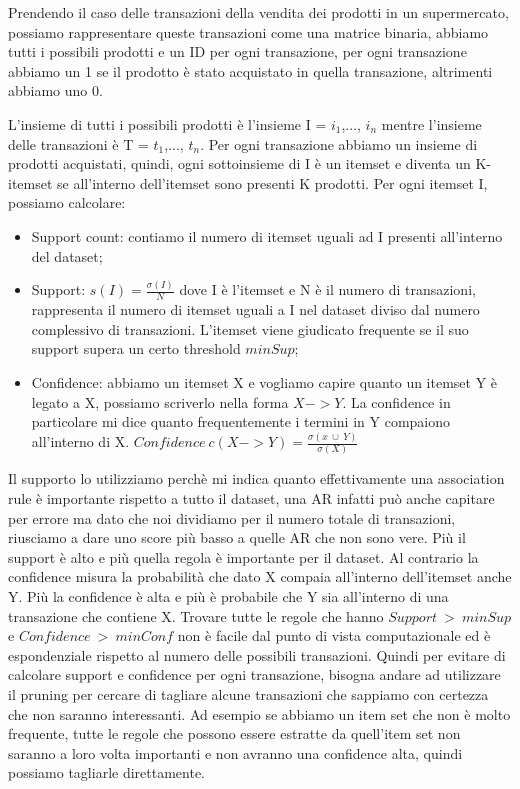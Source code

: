 \documentclass[14pt]{extreport}
\begin{document}
Prendendo il caso delle transazioni della vendita dei prodotti in un supermercato, possiamo rappresentare queste transazioni come una matrice binaria, abbiamo tutti i possibili prodotti e un ID per ogni transazione, per ogni transazione abbiamo un 1 se il prodotto è stato acquistato in quella transazione, altrimenti abbiamo uno 0.

L'insieme di tutti i possibili prodotti è l'insieme I = {$i_1$,..., $i_n$} mentre l'insieme delle transazioni è T = {$t_1$,..., $t_n$}.
Per ogni transazione abbiamo un insieme di prodotti acquistati, quindi, ogni sottoinsieme di I è un itemset e diventa un K-itemset se all'interno dell'itemset sono presenti K prodotti.
Per ogni itemset I, possiamo calcolare:
\begin{itemize}
    \item Support count: contiamo il numero di itemset uguali ad I presenti all'interno del dataset;
    \item Support: $s(I) = \frac{\sigma{(I)}}{N}$ dove I è l'itemset e N è il numero di transazioni, rappresenta il numero di itemset uguali a I nel dataset diviso dal numero complessivo di transazioni. L'itemset viene giudicato frequente se il suo support supera un certo threshold $minSup$;
    \item Confidence: abbiamo un itemset X e vogliamo capire quanto un itemset Y è legato a X, possiamo scriverlo nella forma $X -> Y$.
    La confidence in particolare mi dice quanto frequentemente i termini in Y compaiono all'interno di X.
    \newline
    $Confidence \ c(X->Y) = \frac{\sigma{(x\ \cup \ Y)}}{\sigma{(X)}}$
\end{itemize}

Il supporto lo utilizziamo perchè mi indica quanto effettivamente una association rule è importante rispetto a tutto il dataset, una AR infatti può anche capitare per errore ma dato che noi dividiamo per il numero totale di transazioni, riusciamo a dare uno score più basso a quelle AR che non sono vere. Più il support è alto e più quella regola è importante per il dataset.
Al contrario la confidence misura la probabilità che dato X compaia all'interno dell'itemset anche Y. Più la confidence è alta e più è probabile che Y sia all'interno di una transazione che contiene X.
Trovare tutte le regole che hanno $Support\ > \ minSup$ e $Confidence\ > \ minConf$ non è facile dal punto di vista computazionale ed è espondenziale rispetto al numero delle possibili transazioni.
Quindi per evitare di calcolare support e confidence per ogni transazione, bisogna andare ad utilizzare il pruning per cercare di tagliare alcune transazioni che sappiamo con certezza che non saranno interessanti. Ad esempio se abbiamo un item set che non è molto frequente, tutte le regole che possono essere estratte da quell'item set non saranno a loro volta importanti e non avranno una confidence alta, quindi possiamo tagliarle direttamente.
\end{document}
